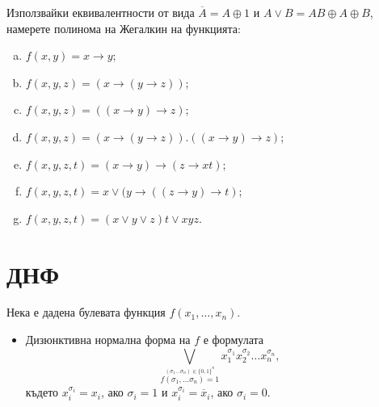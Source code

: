\begin{problem}
  Използвайки еквивалентности от вида $\overline{A} = A\oplus 1$ и $A\vee B = AB\oplus A\oplus B$, 
  намерете полинома на Жегалкин на функцията:
  \begin{enumerate}[a)]
  \item
    $f(x,y) = x\rightarrow y$;
  \item
    $f(x,y,z) = (x\rightarrow (y\rightarrow z))$;
  \item
    $f(x,y,z) = ((x\rightarrow y)\rightarrow z)$;
  \item
    $f(x,y,z) = (x\rightarrow (y\rightarrow z)).((x\rightarrow y)\rightarrow z)$;
  \item
    $f(x,y,z,t) = (x\rightarrow y)\rightarrow (z\rightarrow xt)$;
  \item
    $f(x,y,z,t) = x\vee (y\rightarrow ((z\rightarrow y)\rightarrow t)$;
  \item
    $f(x,y,z,t) = (x\vee y\vee z)t \vee xyz$.
  \end{enumerate}
\end{problem}


\section{ДНФ}

Нека е дадена булевата функция $f(x_1,\dots,x_n)$.
\begin{itemize}
\item
  Дизюнктивна нормална форма на $f$ е формулата
  \[\bigvee_{\stackrel{(\sigma_1\dots \sigma_n) \in \{0,1\}^n}{f(\sigma_1, \dots \sigma_n) = 1}}x_1^{\sigma_1}x_2^{\sigma_2}\dots x_n^{\sigma_n},\]
  където $x^{\sigma_i}_i = x_i$, ако $\sigma_i = 1$ и $x^{\sigma_i}_i = \overline{x}_i$, ако $\sigma_i = 0$.
\end{itemize}

